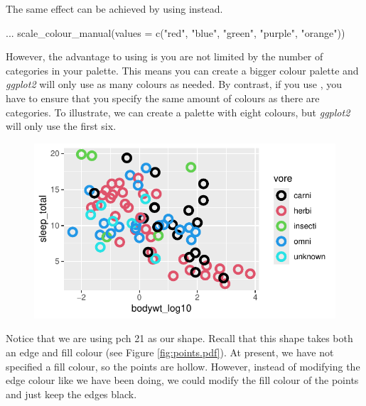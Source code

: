 The same effect can be achieved by using  instead.

\begin{inR}
...
scale_colour_manual(values = c("red", "blue", "green", "purple", "orange"))
\end{inR}

\vspace{1em}

\noindent
However, the advantage to using  is you are not limited by the number of categories in your palette. This means you can create a bigger colour palette and \textit{ggplot2} will only use as many colours as needed. By contrast, if you use , you have to ensure that you specify the same amount of colours as there are categories. To illustrate, we can create a palette with eight colours, but \textit{ggplot2} will only use the first six.


\vspace{2em}

\begin{figure}[H]
\includegraphics[scale = .75]{graphics/ch2Figs/ggEx_23.pdf}
\end{figure}


Notice that we are using pch 21 as our shape. Recall that this shape takes both an edge and fill colour (see Figure \ref{fig:points.pdf}). At present, we have not specified a fill colour, so the points are hollow. However, instead of modifying the edge colour like we have been doing, we could modify the fill colour of the points and just keep the edges black.


